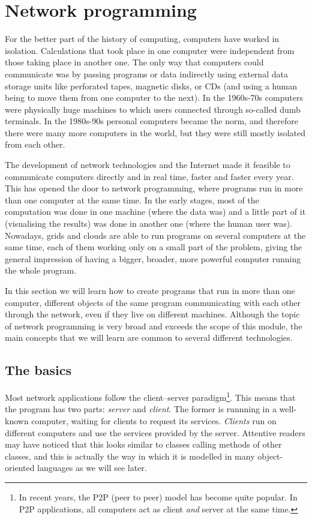 \section{Network programming}
\label{sec:network-programming}

For the better part of the history of computing, computers have worked
in isolation. Calculations that took place in one computer were
independent from those taking place in another one. The only way that
computers could communicate was by passing programs or data 
indirectly using external data storage units
like perforated tapes, magnetic disks, or CDs (and using a human being
to move them from one computer to the next). 
%
In the 1960s-70s computers were physically huge machines to which
users connected through so-called dumb terminals. In the 1980s-90s
personal computers became the norm, and therefore there were many more
computers in the world, but they were still mostly isolated from each
other.

The development of network technologies and the Internet made it
feasible to communicate computers directly and in real time, faster
and faster every year. This has opened the door to network
programming, where programs run in more than one computer at the same
time. In the early stages, most of the computation was done in one
machine (where the data was) and a little part of it (visualising the
results) was done in another one (where the human user was). Nowadays,
grids and clouds are 
able to run programs on several computers at the same time, each of
them working only on a small part of 
the problem, giving the general impression
of having a bigger, broader, more powerful computer running the whole
program. 

In this section we will learn how to create programs that run in more
than one computer, different objects of the same program communicating
with each other through the network, even if they live on different
machines. Although the topic of network programming is very broad and
exceeds the scope of this module, the main concepts that we
will learn are common to several different technologies. 

\subsection{The basics}
\label{sec:basics}

Most network applications follow the client--server
paradigm\footnote{In recent years, the P2P (peer to peer) model has
  become quite popular. In P2P applications, all computers act as client
  \emph{and} server at the same time.}. This means that the program has two 
parts: \emph{server} and \emph{client}. The former is
runnning in a well-known computer, waiting for clients to request its
services.  \emph{Clients} run on different computers and use the
services provided by the server. Attentive readers may have noticed
that this looks similar to classes calling methods of other classes,
and this is actually the way in which it is modelled in many
object-oriented languages as we will see later.


